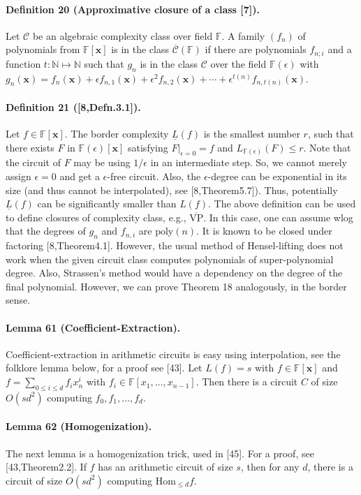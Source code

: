 \documentclass[10pt,a4paper]{article}
\begin{document}
\paragraph{Definition 20 (Approximative closure of a class [7]).} Let $\mathcal C$ be an algebraic complexity class over field $\mathbb F$. A family $(f_n)$ of polynomials from $\mathbb F[\mathbf x]$ is in the class $\overline{\mathcal C}(\mathbb F)$ if there are polynomials $f_{n;i}$ and a function $t:\mathbb N\mapsto\mathbb N$ such that $g_n$ is in the class $\mathcal C$ over the field $\mathbb F(\epsilon)$ with $g_n(\mathbf x)=f_n(\mathbf x)+\epsilon f_{n,1}(\mathbf x)+\epsilon^2f_{n,2}(\mathbf x)+\cdots+\epsilon^{t(n)}f_{n,t(n)}(\mathbf x)$.
\paragraph{Definition 21 ([8,Defn.3.1]).} Let $f\in\mathbb F[\mathbf x]$. The border complexity $\underline L(f)$ is the smallest number $r$, such that there exists $F$ in $\mathbb F(\epsilon)[\mathbf x]$ satisfying $F|_{\epsilon=0}=f$ and $L_{\mathbb F(\epsilon)}(F)\le r$.
Note that the circuit of $F$ may be using $1/\epsilon$ in an intermediate step. So, we cannot merely assign $\epsilon=0$ and get a $\epsilon$-free circuit. Also, the $\epsilon$-degree can be exponential in its size (and thus cannot be interpolated), see [8,Theorem5.7]). Thus, potentially $\underline L(f)$ can be significantly smaller than $L(f)$. The above definition can be used to define closures of complexity class, e.g., $\overline{\mathrm{VP}}$. In this case, one can assume wlog that the degrees of $g_n$ and $f_{n,i}$ are $\mathrm{poly}(n)$. It is known to be closed under factoring [8,Theorem4.1]. However, the usual method of Hensel-lifting does not work when the given circuit class computes polynomials of super-polynomial degree. Also, Strassen's method would have a dependency on the degree of the final polynomial. However, we can prove Theorem 18 analogously, in the border sense.
\paragraph{Lemma 61 (Coefficient-Extraction).} Coefficient-extraction in arithmetic circuits is easy using interpolation, see the folklore lemma below, for a proof see [43]. Let $L(f)=s$ with $f\in\mathbb F[\mathbf x]$ and $f=\sum_{0\le i\le d}f_ix_n^i$ with $f_i\in\mathbb F[x_1,\ldots,x_{n-1}]$. Then there is a circuit $C$ of size $O(sd^2)$ computing $f_0,f_1,\ldots,f_d$.
\paragraph{Lemma 62 (Homogenization).} The next lemma is a homogenization trick, used in [45]. For a proof, see [43,Theorem2.2]. If $f$ has an arithmetic circuit of size $s$, then for any $d$, there is a circuit of size $O(sd^2)$ computing $\mathrm{Hom}_{\le d}f$.
\end{document}
